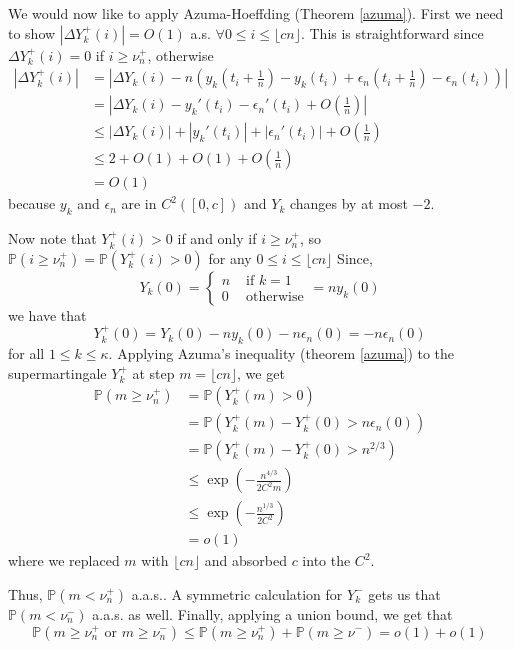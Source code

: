 We would now like to apply Azuma-Hoeffding (Theorem \ref{azuma}). First we need to show \(|\Delta Y_{k}^{+}(i)| = O(1)\) a.s. \(\forall 0 \leq i \leq \lfloor {cn} \rfloor\). This is straightforward since \(\Delta Y_{k}^{+}(i) = 0\) if \(i \geq \nu_{n}^{+}\), otherwise 
\begin{align*}
    |\Delta Y_{k}^{+}(i)| &= |\Delta Y_{k}(i) - n(y_{k}(t_{i} + \frac{1}{n}) - y_{k}(t_{i}) + \epsilon_{n}(t_{i} + \frac{1}{n}) - \epsilon_{n}(t_{i}))| \\
    &= |\Delta Y_{k}(i) - y_{k}'(t_{i}) - \epsilon_{n}'(t_{i}) + O(\frac{1}{n})| \\
    &\leq |\Delta Y_{k}(i)| + |y_{k}'(t_{i})| + |\epsilon_{n}'(t_{i})| + O(\frac{1}{n}) \\
    &\leq 2 + O(1) + O(1) + O(\frac{1}{n}) \\
    &= O(1)
\end{align*}
because \(y_{k}\) and \(\epsilon_{n}\) are in \(C^{2}([0, c])\) and \(Y_{k}\) changes by at most \(-2\).

Now note that \(Y_{k}^{+}(i) > 0\) if and only if \(i \geq \nu_{n}^{+}\), so \(\mathbb{P}(i \geq \nu_{n}^{+}) = \mathbb{P}(Y_{k}^{+}(i) > 0)\) for any \(0 \leq i \leq \lfloor {cn} \rfloor\) Since,
\[
    Y_{k}(0) = \begin{cases} n & \text{ if } k =1 \\ 0 & \text{ otherwise} \end{cases} = ny_{k}(0)
\]
we have that
\[
    Y_{k}^{+}(0) = Y_{k}(0) - ny_{k}(0) - n\epsilon_{n}(0) = -n\epsilon_{n}(0)
\]
for all \(1 \leq k \leq \kappa\). Applying Azuma's inequality (theorem \ref{azuma}) to the supermartingale \(Y_{k}^{+}\) at step \(m = \lfloor {cn} \rfloor\), we get
\begin{align*}
    \mathbb{P}(m \geq \nu_{n}^{+}) &= \mathbb{P}(Y_{k}^{+}(m) > 0) \\
    &= \mathbb{P}(Y_{k}^{+}(m) - Y_{k}^{+}(0) > n\epsilon_{n}(0)) \\
    &= \mathbb{P}(Y_{k}^{+}(m) - Y_{k}^{+}(0) > n^{2/3}) \\
    &\leq  \exp\left( - \frac{n^{4/3} }{2 C^{2}m} \right) \\
    &\leq \exp\left( - \frac{n^{1/3} }{2 C^{2}} \right) \\
    &= o(1)
\end{align*}
where we replaced \(m\) with \(\lfloor {cn} \rfloor\) and absorbed \(c\) into the \(C^{2}\).

Thus, \(\mathbb{P}(m < \nu_{n}^{+})\) a.a.s.. A symmetric calculation for \(Y_{k}^{-}\) gets us that \(\mathbb{P}(m < \nu_{n}^{-})\) a.a.s. as well. Finally, applying a union bound, we get that
\[\mathbb{P}(m \geq \nu_{n}^{+} \text{ or } m \geq \nu_{n}^{-}) \leq \mathbb{P}(m \geq \nu_{n}^{+}) + \mathbb{P}(m \geq \nu^{-}) = o(1) + o(1)\]

